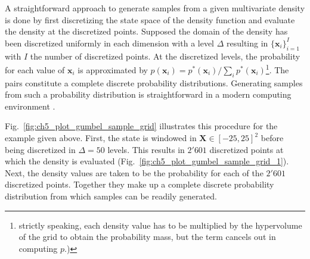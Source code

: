 A straightforward approach to generate samples from a given multivariate density is done by first 
discretizing the state space of the density function and evaluate the density at the discretized points.
Supposed the domain of the density has been discretized uniformly in each dimension with a level $\Delta$ resulting in $\{\bm{x}_i\}_{i=1}^{I}$ with $I$ the number of discretized points.
At the discretized levels, the probability for each value of $\bm{x}_i$ is approximated by $p(\bm{x}_i) = p^*(\bm{x}_i) / \sum_i p^*(\bm{x}_i)$\footnote{strictly speaking, each density value has to be multiplied by the hypervolume of the grid to obtain the probability mass, but the term cancels out in computing $p$.)}.
The pairs constitute a complete discrete probability distributions.
Generating samples from such a probability distribution is straightforward in a modern computing environment \cite{Mackay2005}.

Fig.~\ref{fig:ch5_plot_gumbel_sample_grid} illustrates this procedure for the example given above.
First, the state is windowed in $\mathbf{X}\in[-25,25]^2$ before being discretized in $\Delta = 50$ levels.
This results in $2'601$ discretized points at which the density is evaluated (Fig.~\ref{fig:ch5_plot_gumbel_sample_grid_1}).
Next, the density values are taken to be the probability for each of the $2'601$ discretized points.
Together they make up a complete discrete probability distribution from which samples can be readily generated.

